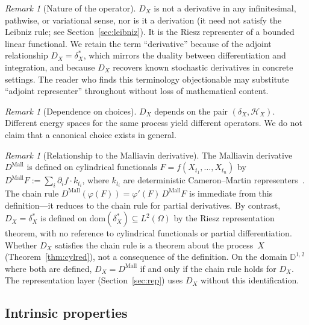 \documentclass[11pt,a4paper]{article}
\theoremstyle{plain}
\theoremstyle{definition}
\theoremstyle{remark}
\newtheorem{remark}[theorem]{Remark}
\newcommand{\dom}{\mathrm{dom}}
\newcommand{\HX}{\mathcal{H}_X}
\begin{document}
\begin{remark}[Nature of the operator]\label{rem:nature}
$D_X$ is not a derivative in any infinitesimal, pathwise, or variational sense, nor is it a derivation (it need not satisfy the Leibniz rule; see Section~\ref{sec:leibniz}). It is the Riesz representer of a bounded linear functional. We retain the term ``derivative'' because of the adjoint relationship $D_X = \delta_X^*$, which mirrors the duality between differentiation and integration, and because $D_X$ recovers known stochastic derivatives in concrete settings. The reader who finds this terminology objectionable may substitute ``adjoint representer'' throughout without loss of mathematical content.
\end{remark}

\begin{remark}[Dependence on choices]\label{rem:choices}
$D_X$ depends on the pair $(\delta_X, \HX)$. Different energy spaces for the same process yield different operators. We do not claim that a canonical choice exists in general.
\end{remark}

\begin{remark}[Relationship to the Malliavin derivative]\label{rem:vs_malliavin}
The Malliavin derivative $D^{\mathrm{Mall}}$ is defined on cylindrical functionals $F = f(X_{t_1},\ldots,X_{t_n})$ by $D^{\mathrm{Mall}}F := \sum_i \partial_i f \cdot k_{t_i}$, where $k_{t_i}$ are deterministic Cameron--Martin representers~\cite{Nualart2006}. The chain rule $D^{\mathrm{Mall}}(\varphi(F)) = \varphi'(F)\,D^{\mathrm{Mall}}F$ is immediate from this definition---it reduces to the chain rule for partial derivatives. By contrast, $D_X = \delta_X^*$ is defined on $\dom(\delta_X^*) \subseteq L^2(\Omega)$ by the Riesz representation theorem, with no reference to cylindrical functionals or partial differentiation. Whether $D_X$ satisfies the chain rule is a theorem about the process~$X$ (Theorem~\ref{thm:cylred}), not a consequence of the definition. On the domain $\mathbb{D}^{1,2}$ where both are defined, $D_X = D^{\mathrm{Mall}}$ if and only if the chain rule holds for $D_X$. The representation layer (Section~\ref{sec:rep}) uses $D_X$ without this identification.
\end{remark}


\subsection{Intrinsic properties}
\end{document}
